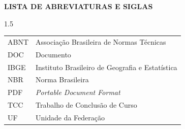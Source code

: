 
\begin{center}
  \textbf{LISTA DE ABREVIATURAS E SIGLAS}
\end{center}

\vspace{1cm}

\begin{spacing}{1.5}
  \noindent
  \begin{tabular}{p{2.5cm} l}
    ABNT & Associação Brasileira de Normas Técnicas \\
    DOC  & Documento \\
    IBGE & Instituto Brasileiro de Geografia e Estatística \\
    NBR  & Norma Brasileira \\
    PDF  & \textit{Portable Document Format} \\
    TCC  & Trabalho de Conclusão de Curso \\
    UF   & Unidade da Federação \\
  \end{tabular}
\end{spacing}

